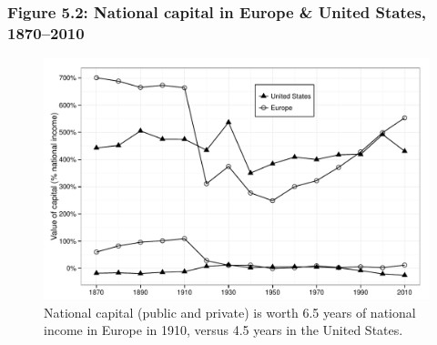 \documentclass[t]{beamer}\usepackage[]{graphicx}\usepackage[]{color}
\newenvironment{knitrout}{}{} %
\begin{document}
\begin{frame}[label=Figure_5_2]
\frametitle{Figure 5.2: National capital in Europe \& United States, 1870--2010}
\begin{figure}[t]
\begin{minipage}[b]{\textwidth}
\centering
\begin{knitrout}\footnotesize
{}\color{fgcolor}

{\centering \includegraphics[width=1\linewidth]{figures/bw/Figure_5_2} 

}



\end{knitrout}
\caption{National capital (public and private) is worth 6.5 years of national income in Europe in 1910, versus 4.5 years in the United States.}
\end{minipage}
\end{figure}
\end{frame}
\end{document}
